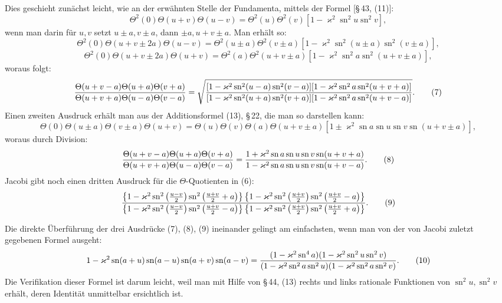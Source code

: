 \documentclass[11pt]{article}
\providecommand{\sn}{\operatorname{sn}}
\begin{document}
Dies geschieht zunächst leicht, wie an der erwähnten Stelle der Fundamenta, mittels der Formel [\S\,43, (11)]:
\[
\Theta^2(0)\Theta(u+v)\Theta(u-v)=\Theta^2(u)\Theta^2(v)[1-\varkappa^2\sn^2u\sn^2v],
\]
wenn man darin für $u,v$ setzt $u\pm a,v\pm a$, dann $\pm a,u+v\pm a$. Man erhält so:
\[
\Theta^2(0)\Theta(u+v\pm2a)\Theta(u-v)
=\Theta^2(u\pm a)\Theta^2(v\pm a)[1-\varkappa^2\sn^2(u\pm a)\sn^2(v\pm a)],
\]
\[
\Theta^2(0)\Theta(u+v\pm2a)\Theta(u+v)
=\Theta^2(a)\Theta^2(u+v\pm a)[1-\varkappa^2\sn^2a\sn^2(u+v\pm a)],
\]
woraus folgt:
\begin{equation}
{\Theta(u+v-a)\Theta(u+a)\Theta(v+a)
\over\Theta(u+v+a)\Theta(u-a)\Theta(v-a)}
=\sqrt{ {[1-\varkappa^2\sn^2(u-a)\sn^2(v-a)][1-\varkappa^2\sn^2a\sn^2(u+v+a)]
\over
[1-\varkappa^2\sn^2(u+a)\sn^2(v+a)][1-\varkappa^2\sn^2a\sn^2(u+v-a)]} }.
\tag{7}
\end{equation}
Einen zweiten Ausdruck erhält man aus der Additionsformel (13), \S\,22, die man so darstellen kann:
\[
\Theta(0)\Theta(u\pm a)\Theta(v\pm a)\Theta(u+v)
=\Theta(u)\Theta(v)\Theta(a)\Theta(u+v\pm a)
[1\pm\varkappa^2\sn a\sn u\sn v\sn(u+v\pm a)],
\]
woraus durch Division:
\begin{equation}
{\Theta(u+v-a)\Theta(u+a)\Theta(v+a)
\over\Theta(u+v+a)\Theta(u-a)\Theta(v-a)}
={1+\varkappa^2\sn a\sn u\sn v\sn(u+v+a)
\over1-\varkappa^2\sn a\sn u\sn v\sn(u+v-a)}.
\tag{8}
\end{equation}
Jacobi gibt noch einen dritten Ausdruck für die $\Theta$-Quotienten in (6):
\begin{equation}
{\left\{1-\varkappa^2\sn^2\left({u-v\over2}\right)\sn^2\left({u+v\over2}+a\right)\right\}
\left\{1-\varkappa^2\sn^2\left({u+v\over2}\right)\sn^2\left({u+v\over2}-a\right)\right\}
\over
\left\{1-\varkappa^2\sn^2\left({u-v\over2}\right)\sn^2\left({u+v\over2}-a\right)\right\}
\left\{1-\varkappa^2\sn^2\left({u+v\over2}\right)\sn^2\left({u+v\over2}+a\right)\right\}}.
\tag{9}
\end{equation}

Die direkte Überführung der drei Ausdrücke (7), (8), (9) ineinander gelingt am einfachsten, wenn man von der von Jacobi zuletzt gegebenen Formel ausgeht:
\begin{equation}
1-\varkappa^2\sn(a+u)\sn(a-u)\sn(a+v)\sn(a-v)
={(1-\varkappa^2\sn^4a)(1-\varkappa^2\sn^2u\sn^2v)
\over(1-\varkappa^2\sn^2a\sn^2u)(1-\varkappa^2\sn^2a\sn^2v)}.
\tag{10}
\end{equation}
Die Verifikation dieser Formel ist darum leicht, weil man mit Hilfe von \S\,44, (13) rechts und links rationale Funktionen von $\sn^2u,\sn^2v$ erhält, deren Identität unmittelbar ersichtlich ist.
\end{document}
